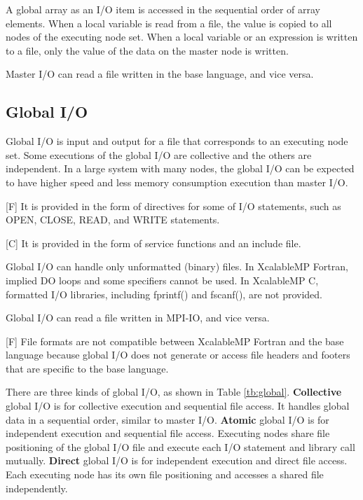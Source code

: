   A global array as an I/O item is accessed in the sequential order of
  array elements.
  When a local variable is read from a file, the value is copied to all
  nodes of the executing node set.
  When a local variable or an expression is written to a file, only the
  value of the data on the master node is written.
  
  Master I/O can read a file written in the base language, and vice
  versa.
  

  \subsection{Global I/O}

  Global I/O is input and output for a file that corresponds to
  an executing node set.
  Some executions of the global I/O are collective and the others are independent.
  In a large system with many nodes, the global I/O can be expected to
  have higher speed and less memory consumption execution than master I/O.

  [F] It is provided in the form of directives for some of I/O
  statements, such as OPEN, CLOSE, READ, and WRITE statements.

  [C] It is provided in the form of service functions and an include file.

  Global I/O can handle only unformatted (binary) files. In XcalableMP Fortran,
  implied DO loops and some specifiers cannot be used.
  In XcalableMP C, formatted I/O libraries, including fprintf() and fscanf(), are not provided.

  Global I/O can read a file written in MPI-IO, and vice versa. 

  [F] File formats are not compatible between XcalableMP Fortran
  and the base language because global I/O does not generate or access
  file headers and footers that are specific to the base language.

  There are three kinds of global I/O, as shown in Table
  \ref{tb:global}.
  {\bf Collective} global I/O is for collective execution and
  sequential file access.
  It handles global data in a sequential order, similar to master
  I/O.
  {\bf Atomic} global I/O is for independent execution and sequential file access.
  Executing nodes share file positioning of the global I/O file and
  execute each I/O statement and library call mutually.
  {\bf Direct} global I/O is for independent execution and direct file access.
  Each executing node has its own file positioning and accesses a shared
  file independently.

